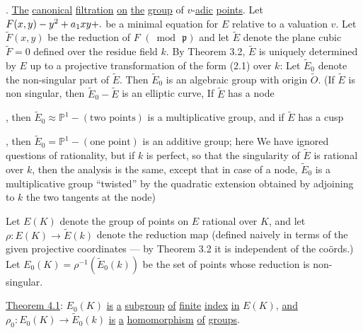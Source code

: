 \begingroup
\makeatletter\tagsleft@true{}. \uline{The} \uline{canonical} \uline{filtration} \uline{on} \uline{the} \uline{group} of $v$-\uline{adic} \uline{points}. Let $F(x,y)-y^2+a_1xy+\ldotp$ be a minimal equation for $E$ relative to a valuation $v$. Let $\widetilde F(x,y)$ be the reduction of $F$ $(\bmod\,\mathfrak{p})$ and let $\widetilde E$ denote the plane cubic $\widetilde F=0$ defined over the residue field $k$. By Theorem 3.2, $\widetilde E$ is uniquely determined by $E$ up to a projective transformation of the form (2.1) over $k$: Let $\widetilde E_0$ denote the non-singular part of $\widetilde E$. Then $\widetilde E_0$ is an algebraic group with origin $\widetilde O$. (If $\widetilde E$ is non singular, then $\widetilde E_0-\widetilde E$ is an elliptic curve, If $\widetilde E$ has a node
\parbox[c]{1.4em}{\setlength{\topsep}{0pt}}, then $\widetilde E_0\approx\mathbb{P}^1-(\text{two points})$ is a multiplicative group, and if $\widetilde E$ has a cusp
\parbox[c]{1.4em}{\setlength{\topsep}{0pt}}, then $\widetilde E_0=\mathbb{P}^1-(\text{one point})$ is an additive group; here We have ignored questions of rationality, but if $k$ is perfect, so that the singularity of $\widetilde E$ is rational over $k$, then the analysis is the same, except that in case of a node, $\widetilde E_0$ is a multiplicative group ``twisted'' by the quadratic extension obtained by adjoining to $k$ the two tangents at the node)

Let $E(K)$ denote the group of points on $E$ rational over $K$, and let $\rho:E(K)\longrightarrow\widetilde E(k)$ denote the reduction map (defined naively in terms of the given projective coordinates --- by Theorem 3.2 it is independent of the coörds.) Let $E_0(K)=\rho^{-1}(\widetilde E_0(k))$ be the set of points whose reduction is non-singular.

\uline{Theorem 4.1}: $E_0(K)$ \uline{is} \uline{a} \uline{subgroup} \uline{of} \uline{finite} \uline{index} \uline{in} $E(K)$, \uline{and} $\rho_0:E_0(K)\to\widetilde E_0(k)$ \uline{is} \uline{a} \uline{homomorphism} \uline{of} \uline{groups}.

